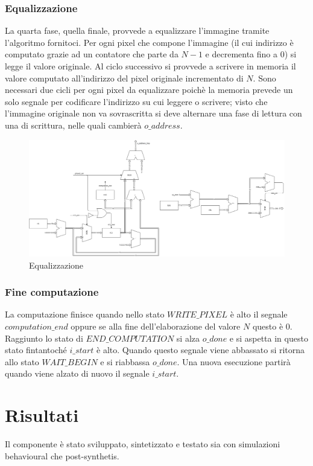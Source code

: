\documentclass[11pt]{article} %
\begin{document}
\subsubsection{Equalizzazione}
La quarta fase, quella finale, provvede a equalizzare l'immagine tramite l'algoritmo fornitoci. Per ogni pixel che compone l'immagine (il cui indirizzo è computato grazie ad un contatore che parte da $N-1$ e decrementa fino a 0) si legge il valore originale. Al ciclo successivo si provvede a scrivere in memoria il valore computato all'indirizzo del pixel originale incrementato di $N$. Sono necessari due cicli per ogni pixel da equalizzare poichè la memoria prevede un solo segnale per codificare l'indirizzo su cui leggere o scrivere; visto che l'immagine originale non va sovrascritta si deve alternare una fase di lettura con una di scrittura, nelle quali cambierà $o\_address$.

\begin{figure}[h]
\centering
\includegraphics[width=120mm]{../datapaths/computation.png}
\caption{Equalizzazione}
\end{figure}

\subsubsection{Fine computazione}
La computazione finisce quando nello stato $WRITE\_PIXEL$ è alto il segnale $computation\_end$ oppure se alla fine dell'elaborazione del valore $N$ questo è $0$. Raggiunto lo stato di $END\_COMPUTATION$ si alza $o\_done$ e si aspetta in questo stato fintantoché $i\_start$ è alto. Quando questo segnale viene abbassato si ritorna allo stato $WAIT\_BEGIN$ e si riabbassa $o\_done$. Una nuova esecuzione partirà quando viene alzato di nuovo il segnale $i\_start$.


\section{Risultati}
Il componente è stato sviluppato, sintetizzato e testato sia con simulazioni behavioural che post-synthetis.
\end{document}
